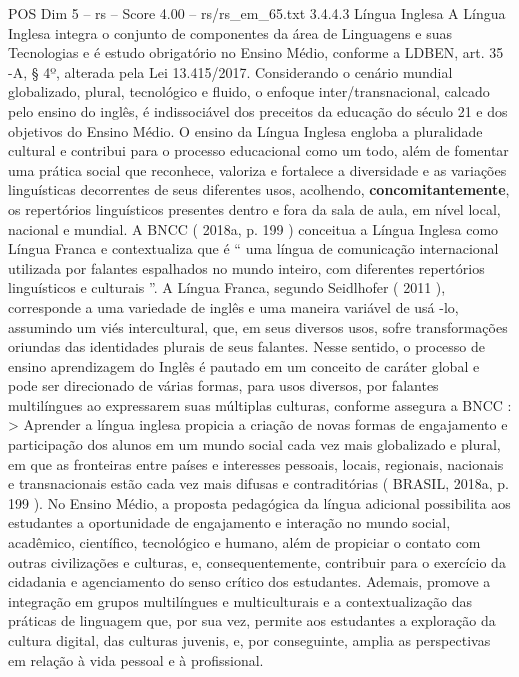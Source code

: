 \begin{textsample}{POS Dim 5 – rs – Score 4.00 – rs/rs\_em\_65.txt}  \label{ex:f5_pos_268}
3.4.4.3 Língua Inglesa A Língua Inglesa integra o conjunto de componentes da área de Linguagens e suas Tecnologias e é estudo obrigatório no Ensino Médio, conforme a LDBEN, art. 35 -A, § 4º, alterada pela Lei 13.415/2017.
Considerando o cenário mundial globalizado, plural, tecnológico e fluido, o enfoque inter/transnacional, calcado pelo ensino do inglês, é indissociável dos preceitos da educação do século 21 e dos objetivos do Ensino Médio.
O ensino da Língua Inglesa engloba a pluralidade cultural e contribui para o processo educacional como um todo, além de fomentar uma prática social que reconhece, valoriza e fortalece a diversidade e as variações linguísticas decorrentes de seus diferentes usos, acolhendo, \textbf{concomitantemente}, os repertórios linguísticos presentes dentro e fora da sala de aula, em nível local, nacional e mundial.
A BNCC ( 2018a, p. 199 ) conceitua a Língua Inglesa como Língua Franca e contextualiza que é “ uma língua de comunicação internacional utilizada por falantes espalhados no mundo inteiro, com diferentes repertórios linguísticos e culturais ”.
A Língua Franca, segundo Seidlhofer ( 2011 ), corresponde a uma variedade de inglês e uma maneira variável de usá -lo, assumindo um viés intercultural, que, em seus diversos usos, sofre transformações oriundas das identidades plurais de seus falantes.
Nesse sentido, o processo de ensino aprendizagem do Inglês é pautado em um conceito de caráter global e pode ser direcionado de várias formas, para usos diversos, por falantes multilíngues ao expressarem suas múltiplas culturas, conforme assegura a BNCC : > Aprender a língua inglesa propicia a criação de novas formas de engajamento e participação dos alunos em um mundo social cada vez mais globalizado e plural, em que as fronteiras entre países e interesses pessoais, locais, regionais, nacionais e transnacionais estão cada vez mais difusas e contraditórias ( BRASIL, 2018a, p. 199 ).
No Ensino Médio, a proposta pedagógica da língua adicional possibilita aos estudantes a oportunidade de engajamento e interação no mundo social, acadêmico, científico, tecnológico e humano, além de propiciar o contato com outras civilizações e culturas, e, consequentemente, contribuir para o exercício da cidadania e agenciamento do senso crítico dos estudantes.
Ademais, promove a integração em grupos multilíngues e multiculturais e a contextualização das práticas de linguagem que, por sua vez, permite aos estudantes a exploração da cultura digital, das culturas juvenis, e, por conseguinte, amplia as perspectivas em relação à vida pessoal e à profissional.

\end{textsample}
